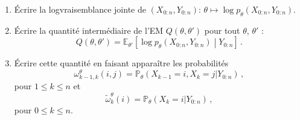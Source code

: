 \documentclass[a4paper,10pt,fleqn]{article}
\newcommand{\1}{\ensuremath{\mathbbm{1}}}
\begin{document}
\begin{enumerate}
\item \'Ecrire la logvraisemblance jointe de $(X_{0:n},Y_{0:n})$: $\theta \mapsto \log p_\theta (X_{0:n},Y_{0:n})$.

%
\item \'Ecrire la quantit\'e interm\'ediaire de l'EM $Q(\theta,\theta')$ pour tout $\theta$, $\theta'$ :
$$
Q(\theta,\theta') = \mathbb{E}_{\theta'}\left[\log p_\theta (X_{0:n},Y_{0:n})\middle |Y_{0:n}\right]\,.
$$

%
\item \'Ecrire cette quantit\'e en faisant appara\^itre les probabilit\'es
$$
\omega_{k-1,k}^{\theta}(i,j) = \mathbb{P}_{\theta}\left(X_{k-1}=i,X_k=j|Y_{0:n}\right)\,,
$$
pour $1\leq k \leq n$ et
$$
\tilde \omega_{k}^{\theta}(i) = \mathbb{P}_{\theta}\left(X_k=i|Y_{0:n}\right)\,,
$$
pour $0\leq k \leq n$.


\end{enumerate}
\end{document}
